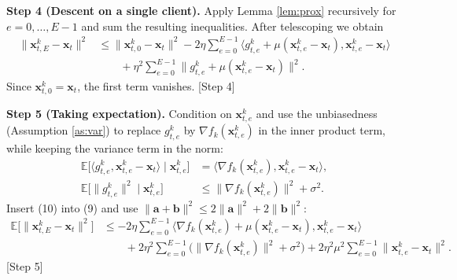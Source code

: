 \documentclass{article}
\begin{document}
\noindent\textbf{Step 4 (Descent on a single client).}  
Apply Lemma \ref{lem:prox} recursively for $e=0,\dots,E-1$ and sum the resulting inequalities.
After telescoping we obtain
\[
\begin{aligned}
\|\mathbf{x}^{k}_{t,E}-\mathbf{x}_t\|^2
&\le
\|\mathbf{x}^{k}_{t,0}-\mathbf{x}_t\|^2
-2\eta\sum_{e=0}^{E-1}
   \langle g_{t,e}^{k}+\mu(\mathbf{x}^{k}_{t,e}-\mathbf{x}_t),
          \mathbf{x}^{k}_{t,e}-\mathbf{x}_t\rangle   \\
&\qquad
+\eta^2\sum_{e=0}^{E-1}
   \|g_{t,e}^{k}+\mu(\mathbf{x}^{k}_{t,e}-\mathbf{x}_t)\|^2 .
\end{aligned}
\tag{9}
\]
Since $\mathbf{x}^{k}_{t,0}=\mathbf{x}_t$, the first term vanishes.
[Step 4]

\noindent\textbf{Step 5 (Taking expectation).}  
Condition on $\mathbf{x}^{k}_{t,e}$ and use the unbiasedness (Assumption \ref{as:var}) to replace $g_{t,e}^{k}$ by $\nabla f_k(\mathbf{x}^{k}_{t,e})$ in the inner product term, while keeping the variance term in the norm:
\[
\begin{aligned}
\mathbb{E}\big[\langle g_{t,e}^{k},\mathbf{x}^{k}_{t,e}-\mathbf{x}_t\rangle\mid\mathbf{x}^{k}_{t,e}\big]
&= \langle \nabla f_k(\mathbf{x}^{k}_{t,e}),\mathbf{x}^{k}_{t,e}-\mathbf{x}_t\rangle,\\
\mathbb{E}\big[\|g_{t,e}^{k}\|^2\mid\mathbf{x}^{k}_{t,e}\big]
&\le \|\nabla f_k(\mathbf{x}^{k}_{t,e})\|^2+\sigma^2 .
\end{aligned}
\tag{10}
\]
Insert (10) into (9) and use $\|\mathbf{a}+\mathbf{b}\|^2\le2\|\mathbf{a}\|^2+2\|\mathbf{b}\|^2$:
\[
\begin{aligned}
\mathbb{E}\big[\|\mathbf{x}^{k}_{t,E}-\mathbf{x}_t\|^2\big]
&\le
-2\eta\sum_{e=0}^{E-1}
   \langle \nabla f_k(\mathbf{x}^{k}_{t,e})+\mu(\mathbf{x}^{k}_{t,e}-\mathbf{x}_t),
          \mathbf{x}^{k}_{t,e}-\mathbf{x}_t\rangle   \\
&\qquad
+2\eta^2\sum_{e=0}^{E-1}
   \big(\|\nabla f_k(\mathbf{x}^{k}_{t,e})\|^2+\sigma^2\big)
+2\eta^2\mu^2\sum_{e=0}^{E-1}\|\mathbf{x}^{k}_{t,e}-\mathbf{x}_t\|^2 .
\end{aligned}
\tag{11}
\]
[Step 5]
\end{document}
